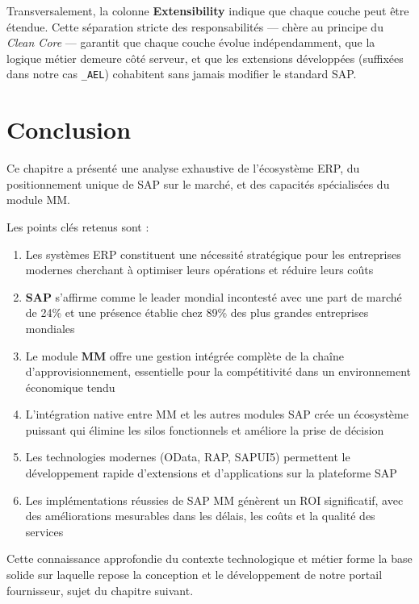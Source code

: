 \documentclass[12pt,a4paper,oneside]{report}
\begin{document}
Transversalement, la colonne \textbf{Extensibility} indique que chaque couche peut être
étendue. Cette séparation stricte des responsabilités --- chère au principe du
\textit{Clean Core} --- garantit que chaque couche évolue indépendamment, que la logique
métier demeure côté serveur, et que les extensions développées (suffixées dans notre cas
\texttt{\_AEL}) cohabitent sans jamais modifier le standard SAP.


\section{Conclusion}\label{ch2:conclusion}

Ce chapitre a présenté une analyse exhaustive de l'écosystème ERP, du positionnement unique de SAP sur le marché, 
et des capacités spécialisées du module MM.

Les points clés retenus sont :

\begin{enumerate}[label=(\Alph*), itemsep=0.2em]
	\item Les systèmes ERP constituent une nécessité stratégique pour les entreprises modernes cherchant 
	à optimiser leurs opérations et réduire leurs coûts
	\item \textbf{SAP} s'affirme comme le leader mondial incontesté avec une part de marché de 24\% et une présence 
	établie chez 89\% des plus grandes entreprises mondiales
	\item Le module \textbf{MM} offre une gestion intégrée complète de la chaîne d'approvisionnement, 
	essentielle pour la compétitivité dans un environnement économique tendu
	\item L'intégration native entre MM et les autres modules SAP crée un écosystème puissant 
	qui élimine les silos fonctionnels et améliore la prise de décision
	\item Les technologies modernes (OData, RAP, SAPUI5) permettent le développement rapide 
	d'extensions et d'applications sur la plateforme SAP
	\item Les implémentations réussies de SAP MM génèrent un ROI significatif, 
	avec des améliorations mesurables dans les délais, les coûts et la qualité des services
\end{enumerate}

Cette connaissance approfondie du contexte technologique et métier forme la base solide 
sur laquelle repose la conception et le développement de notre portail fournisseur, 
sujet du chapitre suivant.
\end{document}
